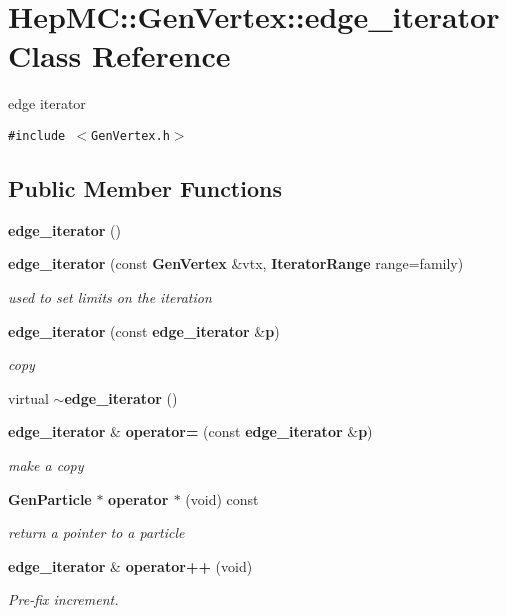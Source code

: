 \section{Hep\-MC::Gen\-Vertex::edge\_\-iterator Class Reference}
\label{classHepMC_1_1GenVertex_1_1edge__iterator}
edge iterator  


{\tt \#include $<$Gen\-Vertex.h$>$}

\subsection*{Public Member Functions}
\begin{CompactItemize}
\item 
{\bf edge\_\-iterator} ()
\item 
{\bf edge\_\-iterator} (const {\bf Gen\-Vertex} \&vtx, {\bf Iterator\-Range} range=family)
\begin{CompactList}\small\item\em used to set limits on the iteration \item\end{CompactList}\item 
{\bf edge\_\-iterator} (const {\bf edge\_\-iterator} \&{\bf p})
\begin{CompactList}\small\item\em copy \item\end{CompactList}\item 
virtual {\bf $\sim$edge\_\-iterator} ()
\item 
{\bf edge\_\-iterator} \& {\bf operator=} (const {\bf edge\_\-iterator} \&{\bf p})
\begin{CompactList}\small\item\em make a copy \item\end{CompactList}\item 
{\bf Gen\-Particle} $\ast$ {\bf operator $\ast$} (void) const
\begin{CompactList}\small\item\em return a pointer to a particle \item\end{CompactList}\item 
{\bf edge\_\-iterator} \& {\bf operator++} (void)
\begin{CompactList}\small\item\em Pre-fix increment. \item\end{CompactList}\item 

\end{CompactItemize}
